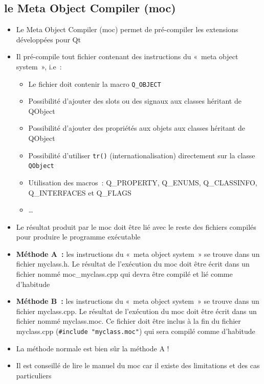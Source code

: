 \documentclass{beamer} %
\begin{document}
\subsection{le Meta Object Compiler (moc)}
\begin{frame}
	\begin{itemize}
	\item Le Meta Object Compiler (moc) permet de pré-compiler les extensions développées pour Qt
	\item<2-> Il pré-compile tout fichier contenant des instructions du «~meta object system~», i.e~:
		\begin{itemize}
		\item<3-> \alert{Le fichier doit contenir la macro \texttt{Q\_OBJECT}}
		\item<4-> Possibilité d'ajouter des slots ou des signaux aux classes héritant de QObject
		\item<5-> Possibilité d'ajouter des propriétés aux objets aux classes héritant de QObject
		\item<6-> Possibilité d'utiliser \texttt{tr()} (internationalisation) directement sur la classe \texttt{QObject}
		\item<7-> Utilisation des macros~: {\ttfamily Q\_PROPERTY, Q\_ENUMS, Q\_CLASSINFO, Q\_INTERFACES et Q\_FLAGS}
		\item<8-> \ldots
		\end{itemize}
	\end{itemize}
\end{frame}

\begin{frame}
	\begin{itemize}
	\item Le résultat produit par le moc doit être lié avec le reste des fichiers compilés pour produire le programme exécutable
	\item<2-> \textbf{Méthode A~:} les instructions du «~meta object system~» se trouve dans un fichier myclass.h. Le résultat de l'exécution du moc doit être écrit dans un fichier nommé moc\_myclass.cpp qui devra être compilé et lié comme d'habitude
	\item<3-> \textbf{Méthode B~:} les instructions du «~meta object system~» se trouve dans un fichier myclass.cpp. Le résultat de l'exécution du moc doit être écrit dans un fichier nommé myclass.moc. Ce fichier doit être inclus à la fin du fichier myclass.cpp (\texttt{\#include "myclass.moc"}) qui sera compilé comme d'habitude
	\item<4-> \alert{La méthode normale est bien sûr la méthode A !}
	\item<5-> Il est conseillé de lire le manuel du moc car il existe des limitations et des cas particuliers
	\end{itemize}
\end{frame}
\end{document}
